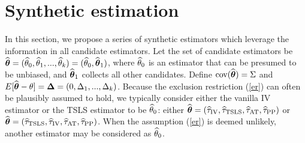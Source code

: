 \documentclass{article}
\def\siv{_{\text{IV}}}
\def\spp{_{\text{PP}}}
\def\sat{_{\text{AT}}}
\def\stsls{_{\text{TSLS}}}
\newtheorem{assumption}{Assumption}
\begin{document}





\section{Synthetic estimation}

In this section, we propose a series of synthetic estimators which leverage the information in all candidate estimators. Let the set of candidate estimators be ${\widehat{\boldsymbol{\theta}}} = ({\widehat\theta}_0, {\widehat\theta}_1, ..., {\widehat\theta}_k) = ({\widehat\theta}_0, {\widehat{\boldsymbol{\theta}}}_1)$, where ${\widehat\theta}_0$ is an estimator that can be presumed to be unbiased, and ${\widehat{\boldsymbol{\theta}}}_1$ collects all other candidates. Define $\mbox{cov}({\widehat{\boldsymbol{\theta}}}) = \Sigma$ and $E[{\widehat{\boldsymbol{\theta}}} - \theta] = \boldsymbol{\Delta} = (0, \Delta_1, ..., \Delta_k)$. Because the exclusion restriction (\ref{er}) can often be plausibly assumed to hold, we typically consider either the vanilla IV estimator or the TSLS estimator to be ${\widehat\theta}_0$: either $\bthetahat = (\tauhat\siv, \tauhat\stsls, \tauhat\sat, \tauhat\spp)$ or $\bthetahat = (\tauhat\stsls, \tauhat\siv, \tauhat\sat, \tauhat\spp)$. When the assumption (\ref{er}) is deemed unlikely, another estimator may be considered as ${\widehat\theta}_0$. 
\end{document}

